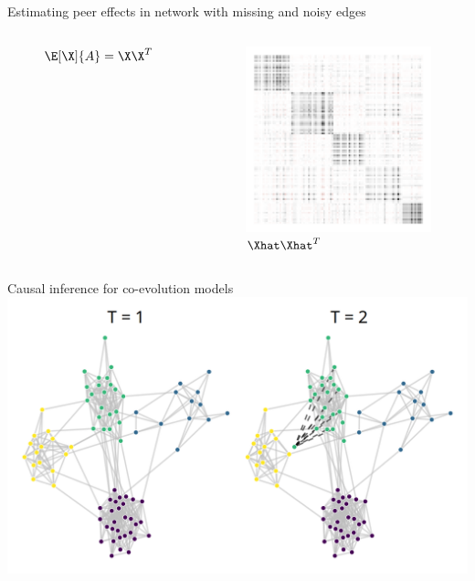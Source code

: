 \documentclass[aspectratio=169]{beamer}
\theoremstyle{remark}
\begin{document}
\begin{frame}{Estimating peer effects in network with missing and noisy edges}
\begin{columns}
\begin{figure}
            \caption{$\E[\X]{A} = \X \X^T$}
        \end{figure}
        \begin{figure}
            \includegraphics[width=\textwidth]{figures/matrices/Phat.png}
            \caption{$\Xhat \Xhat^T$}
        \end{figure}
    \end{columns}
\end{frame}

\begin{frame}{Causal inference for co-evolution models}
    \centering
    \includegraphics{./figures/time-varying.png}
\end{frame}
\end{document}
